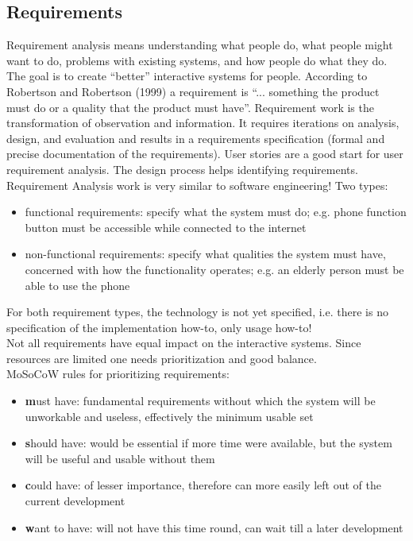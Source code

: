 \subsection{Requirements}
Requirement analysis means understanding what people do, what people might want to do, problems with existing systems, and how people do what they do. The goal is to create ``better'' interactive systems for people. According to Robertson and Robertson (1999) a requirement is ``... something the product must do or a quality that the product must have''. Requirement work is the transformation of observation and information. It requires iterations on analysis, design, and evaluation and results in a requirements specification (formal and precise documentation of the requirements). User stories are a good start for user requirement analysis. The design process helps identifying requirements. Requirement Analysis work is very similar to software engineering! Two types:
\begin{itemize}
\item functional requirements: specify what the system must do; e.g. phone function button must be accessible while connected to the internet
\item non-functional requirements: specify what qualities the system must have, concerned with how the functionality operates; e.g. an elderly person must be able to use the phone
\end{itemize} 
For both requirement types, the technology is not yet specified, i.e. there is no specification of the implementation how-to, only usage how-to!\\
Not all requirements have equal impact on the interactive systems. Since resources are limited one needs prioritization and good balance.\\
MoSoCoW rules for prioritizing requirements:
\begin{itemize}
\item \textbf{m}ust have: fundamental requirements without which the system will be unworkable and useless, effectively the minimum usable set
\item \textbf{s}hould have: would be essential if more time were available, but the system will be useful and usable without them
\item \textbf{c}ould have: of lesser importance, therefore can more easily left out of the current development
\item \textbf{w}ant to have: will not have this time round, can wait till a later development
\end{itemize}
